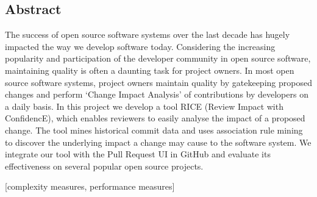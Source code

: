 
\subsection*{Abstract}
The success of open source software systems over the last decade has hugely impacted the way we develop software today. Considering the increasing popularity and participation of the developer community in open source software, maintaining quality is often a daunting task for project owners. In most open source software systems, project owners maintain quality by gatekeeping proposed changes and perform `Change Impact Analysis' of contributions by developers on a daily basis. In this project we develop a tool RICE (Review Impact with ConfidencE), which enables reviewers to easily analyse the impact of a proposed change. The tool mines historical commit data and uses association rule mining to discover the underlying impact a change may cause to the software system. We integrate our tool with the Pull Request UI in GitHub and evaluate its effectiveness on several popular open source projects.


[complexity measures, performance measures]


